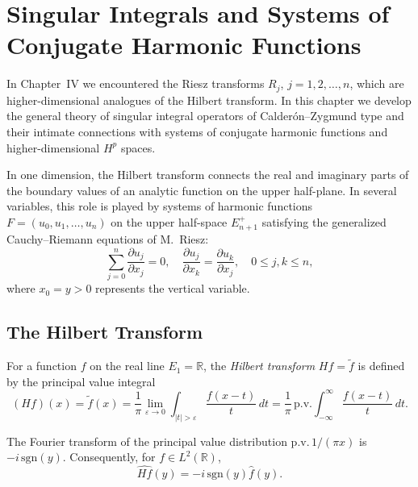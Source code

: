 \chapter{Singular Integrals and Systems of Conjugate Harmonic Functions}
\label{ch:singular-integrals}

In Chapter~IV we encountered the Riesz transforms $R_j$, $j = 1, 2, \dots, n$, which are higher-dimensional analogues of the Hilbert transform. In this chapter we develop the general theory of singular integral operators of Calder\'on--Zygmund type and their intimate connections with systems of conjugate harmonic functions and higher-dimensional $H^p$ spaces.

In one dimension, the Hilbert transform connects the real and imaginary parts of the boundary values of an analytic function on the upper half-plane. In several variables, this role is played by systems of harmonic functions $F = (u_0, u_1, \dots, u_n)$ on the upper half-space $E_{n+1}^+$ satisfying the generalized Cauchy--Riemann equations of M.~Riesz:
\[
\sum_{j=0}^n \frac{\partial u_j}{\partial x_j} = 0, \quad \frac{\partial u_j}{\partial x_k} = \frac{\partial u_k}{\partial x_j}, \quad 0 \leq j, k \leq n,
\]
where $x_0 = y > 0$ represents the vertical variable.

\section{The Hilbert Transform}

For a function $f$ on the real line $E_1 = \mathbb{R}$, the \emph{Hilbert transform} $Hf = \tilde{f}$ is defined by the principal value integral
\begin{equation}\label{eq:c6-1-1}
(Hf)(x) = \tilde{f}(x) = \frac{1}{\pi} \lim_{\varepsilon \to 0} \int_{|t| > \varepsilon} \frac{f(x - t)}{t}\,dt = \frac{1}{\pi} \,\text{p.v.} \int_{-\infty}^\infty \frac{f(x - t)}{t}\,dt.
\end{equation}

\begin{lemma}\label{lem:c6-1-2}
The Fourier transform of the principal value distribution $\text{p.v.}\,1/(\pi x)$ is $-i\,\text{sgn}(y)$. Consequently, for $f \in L^2(\mathbb{R})$,
\begin{equation}\label{eq:c6-1-3}
\widehat{Hf}(y) = -i\,\text{sgn}(y) \hat{f}(y).
\end{equation}
\end{lemma}

